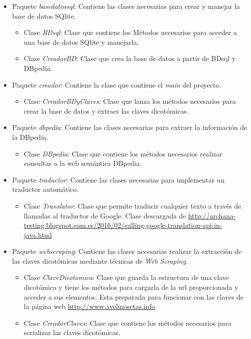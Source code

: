\begin{itemize}
	\item Paquete \textit{basedatossql}: Contiene las clases necesarias para crear y manejar la base de datos SQlite.
	\begin{itemize}
		\item Clase \textit{BDsql}: Clase que contiene los Métodos necesarios para acceder a una base de datos SQlite y manejarla.
		\item Clase \textit{CreadorBD}: Clase que crea la base de datos a partir de BDsql y DBpedia.
	\end{itemize}
	\item Paquete \textit{creador}: Contiene la clase que contiene el \textit{main} del proyecto.
	\begin{itemize}
		\item Clase \textit{CreadorBDyClaves}: Clase que lanza los métodos necesarios para crear la base de datos y extraer las claves dicotómicas.
	\end{itemize}
	\item Paquete \textit{dbpedia}: Contiene las clases necesarias para extraer la información de la DBpedia.
	\begin{itemize}
		\item Clase \textit{DBpedia}: Clase que contiene los métodos necesarios realizar consultas a la web semántica DBpedia.
	\end{itemize}
	\item Paquete \textit{traductor}: Contiene las clases necesarias para implementar un traductor automático.
	\begin{itemize}
		\item Clase \textit{Translator}: Clase que permite traducir cualquier texto a través de llamadas al traductor de Google. Clase descargada de \url{http://archana-testing.blogspot.com.es/2016/02/calling-google-translation-api-in-java.html}
	\end{itemize}
	\item Paquete \textit{webscraping}: Contiene las clases necesarias realizar la extracción de las claves dicotómicas mediante técnicas de \textit{Web Scraping}.
	\begin{itemize}
		\item Clase \textit{ClaveDicotomica}: Clase que guarda la estructura de una clave dicotómica y tiene los métodos para cargarla de la url proporcionada y acceder a sus elementos. Esta preparada para funcionar con las claves de la página web \url{http://www.avelinosetas.info}
		\item Clase \textit{CreadorClaves}: Clase que contiene los métodos necesarios para serializar las claves dicotómicas.
	\end{itemize}
\end{itemize}
